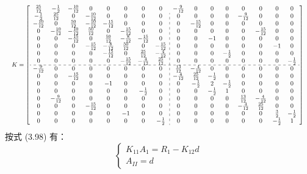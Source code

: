 \documentclass[a4paper, 12pt]{article}
\begin{document}
\[
\resizebox{\textwidth}{!}{%
$
K = 
\left[
\begin{array}{cccccccc:cccccccc}
\frac{25}{12} & -\frac{1}{2} & -\frac{10}{12} & 0 & 0 & 0 & 0 & 0 & -\frac{9}{12} & 0 & 0 & 0 & 0 & 0 & 0 & 0 \\
-\frac{1}{2} & \frac{25}{12} & 0 & -\frac{10}{12} & 0 & 0 & 0 & 0 & 0 & 0 & 0 & 0 & -\frac{9}{12} & 0 & 0 & 0 \\
-\frac{10}{12} & 0 & \frac{50}{12} & -\frac{10}{12} & -\frac{15}{12} & 0 & 0 & 0 & 0 & -\frac{15}{12} & 0 & 0 & 0 & 0 & 0 & 0 \\
0 & -\frac{10}{12} & -\frac{10}{12} & \frac{50}{12} & 0 & -\frac{15}{12} & 0 & 0 & 0 & 0 & 0 & 0 & 0 & -\frac{15}{12} & 0 & 0 \\
0 & 0 & -\frac{15}{12} & 0 & \frac{50}{12} & -\frac{8}{12} & -\frac{15}{12} & 0 & 0 & 0 & -1 & 0 & 0 & 0 & 0 & 0 \\
0 & 0 & 0 & -\frac{15}{12} & -\frac{8}{12} & \frac{50}{12} & 0 & -\frac{15}{12} & 0 & 0 & 0 & 0 & 0 & 0 & -1 & 0 \\
0 & 0 & 0 & 0 & -\frac{15}{12} & 0 & \frac{25}{12} & -\frac{4}{12} & 0 & 0 & 0 & -\frac{1}{2} & 0 & 0 & 0 & 0 \\
0 & 0 & 0 & 0 & 0 & -\frac{15}{12} & -\frac{4}{12} & \frac{25}{12} & 0 & 0 & 0 & 0 & 0 & 0 & 0 & -\frac{1}{2} \\
\hdashline
-\frac{9}{12} & 0 & 0 & 0 & 0 & 0 & 0 & 0 & \frac{13}{12} & -\frac{4}{12} & 0 & 0 & 0 & 0 & 0 & 0 \\
0 & 0 & -\frac{15}{12} & 0 & 0 & 0 & 0 & 0 & -\frac{4}{12} & \frac{25}{12} & -\frac{1}{2} & 0 & 0 & 0 & 0 & 0 \\
0 & 0 & 0 & 0 & -1 & 0 & 0 & 0 & 0 & -\frac{1}{2} & 2 & -\frac{1}{2} & 0 & 0 & 0 & 0 \\
0 & 0 & 0 & 0 & 0 & 0 & -\frac{1}{2} & 0 & 0 & 0 & -\frac{1}{2} & 1 & 0 & 0 & 0 & 0 \\
0 & -\frac{9}{12} & 0 & 0 & 0 & 0 & 0 & 0 & 0 & 0 & 0 & 0 & \frac{13}{12} & -\frac{4}{12} & 0 & 0 \\
0 & 0 & 0 & -\frac{15}{12} & 0 & 0 & 0 & 0 & 0 & 0 & 0 & 0 & -\frac{4}{12} & \frac{25}{12} & 0 & 0 \\
0 & 0 & 0 & 0 & 0 & -1 & 0 & 0 & 0 & 0 & 0 & 0 & 0 & 0 & \frac{3}{2} & -\frac{1}{2} \\
0 & 0 & 0 & 0 & 0 & 0 & 0 & -\frac{1}{2} & 0 & 0 & 0 & 0 & 0 & 0 & -\frac{1}{2} & 1
\end{array}
\right]
$
}
\]
按式 (3.98) 有：
\[
\begin{cases}
K_{11}A_1 = R_1 - K_{12}d \\
A_{II} = d
\end{cases}
\]
\end{document}
